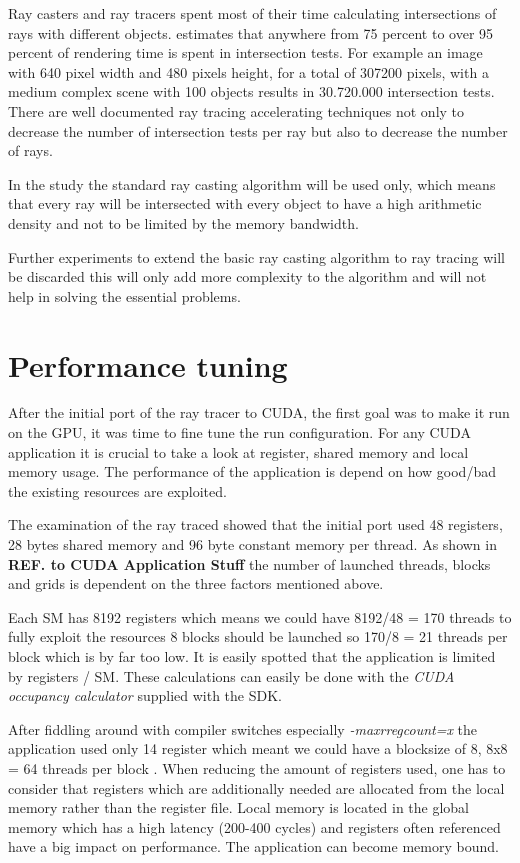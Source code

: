 Ray casters and ray tracers spent most of their time calculating intersections
of rays with different objects. \citeauthor{Whitted80} \citep{Whitted80} estimates
that anywhere from 75 percent to over 95 percent of rendering time is spent in
intersection tests. For example an image with 640 pixel width and 480 pixels
height, for a total of 307200 pixels, with a medium complex scene with 100
objects results in 30.720.000 intersection tests. There are well documented ray
tracing accelerating techniques not only to decrease the number of intersection
tests per ray but also to decrease the number of rays.

In the study the standard ray casting algorithm will be used only, which means
that every ray will be intersected with every object to have a high arithmetic
density and not to be limited by the memory bandwidth.

Further experiments to extend the basic ray casting algorithm to ray tracing 
will be discarded this will only add more complexity to the algorithm and will
not help in solving the essential problems. 

\section{Performance tuning} %
\label{sec:performance_tuning}

After the initial port of the ray tracer to \gls{CUDA}, the first goal was to 
make it run on the \gls{GPU}, it was time to fine tune the run configuration. 
For any \gls{CUDA} application it is crucial to take a look at register, shared 
memory and local memory usage. The performance of the application is depend on
how good/bad the existing resources are exploited.

The examination of the ray traced showed that the initial port used 48
registers, 28 bytes shared memory and 96 byte constant memory per thread. As
shown in \textbf{REF. to CUDA Application Stuff} the number of launched threads,
blocks and grids is dependent on the three factors mentioned above.

Each \gls{SM} has 8192 registers which means we could have 8192/48 = 170 threads
to fully exploit the resources 8 blocks should be launched so 170/8 = 21 threads per block which is by far too low. It is easily spotted that the application is
limited by registers / \gls{SM}. These calculations can easily be done with the \emph{CUDA occupancy calculator} supplied with the SDK. 

After fiddling around with compiler switches especially \emph{-maxrregcount=x}
the application used only 14 register which meant we could have a blocksize of
8, 8x8 = 64 threads per block . When reducing the amount of registers used, one
has to consider that registers which are additionally needed are allocated from
the local memory rather than the register file. Local memory is located in the
global memory which has a high latency (200-400 cycles) and registers often
referenced have a big impact on performance. The application can become memory
bound.

